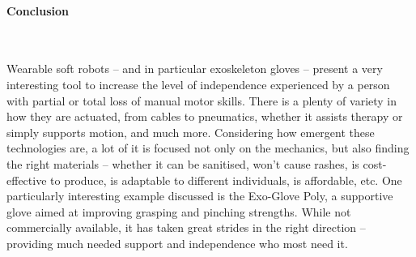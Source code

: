 \paragraph{Conclusion}
\

Wearable soft robots -- and in particular exoskeleton gloves -- present a very interesting tool to increase the level of independence experienced by a person with partial or total loss of manual motor skills.
There is a plenty of variety in how they are actuated, from cables to pneumatics, whether it assists therapy or simply supports motion, and much more.
Considering how emergent these technologies are, a lot of it is focused not only on the mechanics, but also finding the right materials -- whether it can be sanitised, won't cause rashes, is cost-effective to produce, is adaptable to different individuals, is affordable, etc.
One particularly interesting example discussed is the Exo-Glove Poly, a supportive glove aimed at improving grasping and pinching strengths.
While not commercially available, it has taken great strides in the right direction -- providing much needed support and independence who most need it. 